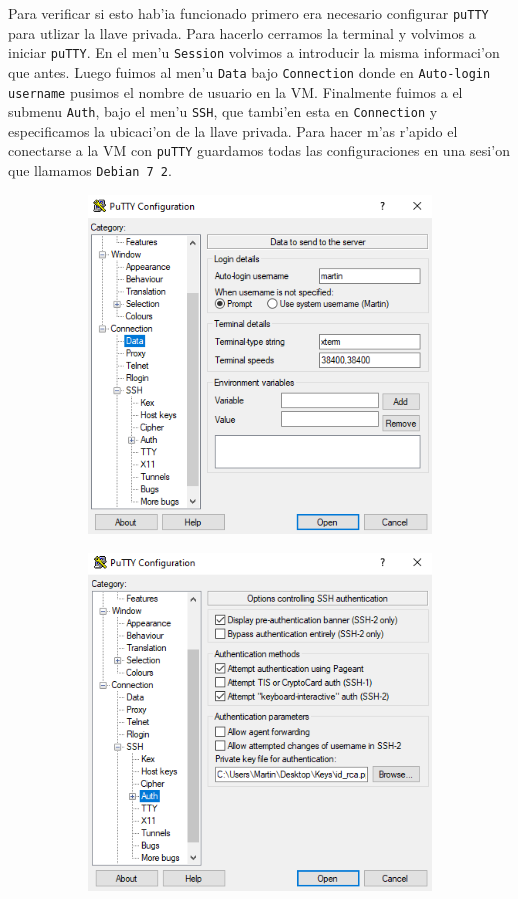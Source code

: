 \documentclass[11pt]{article}
\begin{document}
		Para verificar si esto hab'ia funcionado primero era necesario configurar \texttt{puTTY} para utlizar la llave privada. Para hacerlo cerramos la terminal y volvimos a iniciar \texttt{puTTY}. En el men'u \texttt{Session} volvimos a introducir la misma informaci'on que antes. Luego fuimos al men'u \texttt{Data} bajo \texttt{Connection} donde en \texttt{Auto-login username} pusimos el nombre de usuario en la VM. Finalmente fuimos a el submenu \texttt{Auth}, bajo el men'u \texttt{SSH}, que tambi'en esta en \texttt{Connection} y especificamos la ubicaci'on de la llave privada. Para hacer m'as r'apido el conectarse a la VM con \texttt{puTTY} guardamos todas las configuraciones en una sesi'on que llamamos \texttt{Debian 7 2}.
		
		\begin{figure}[H]
			\centering
			\begin{subfigure}[b]{0.45\linewidth}
				\includegraphics[scale=0.48]{Images/Connection/putty_data.PNG}
			\end{subfigure}
			\begin{subfigure}[b]{0.45\linewidth}
				\includegraphics[scale=0.48]{Images/Connection/putty_SSH.PNG}

\end{subfigure}
\end{figure}
\end{document}
